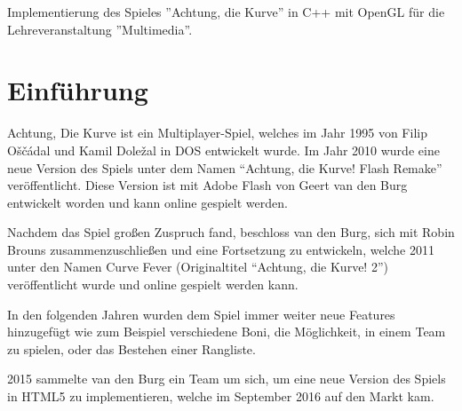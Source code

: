 \documentclass[doktyp=studarbeit]{TUBAFarbeiten}
\begin{document}
\maketitle

\TUBAFErklaerungsseite

Implementierung des Spieles ''Achtung, die Kurve'' in C++ mit OpenGL für die 
Lehreveranstaltung ''Multimedia''.




\tableofcontents
\listoffigures
\listoftables

\newpage

\section{Einführung}

Achtung, Die Kurve ist ein Multiplayer-Spiel, welches im Jahr 1995 von 
Filip Oščádal und Kamil Doležal in DOS entwickelt wurde. Im Jahr 2010 wurde 
eine neue Version des Spiels unter dem Namen “Achtung, die Kurve! Flash Remake”
veröffentlicht. Diese Version ist mit Adobe Flash von Geert van den Burg 
entwickelt worden und kann online gespielt werden.

Nachdem das Spiel großen Zuspruch fand, beschloss van den Burg, sich mit 
Robin Brouns zusammenzuschließen und eine Fortsetzung zu entwickeln, welche 
2011 unter den Namen Curve Fever (Originaltitel “Achtung, die Kurve! 2”) 
veröffentlicht wurde und online gespielt werden kann.

In den folgenden Jahren wurden dem Spiel immer weiter neue Features 
hinzugefügt wie zum Beispiel verschiedene Boni, die Möglichkeit, in einem Team 
zu spielen, oder das Bestehen einer Rangliste.

2015 sammelte van den Burg ein Team um sich, um eine neue Version des Spiels in 
HTML5 zu implementieren, welche im September 2016 auf den Markt kam.
\end{document}
